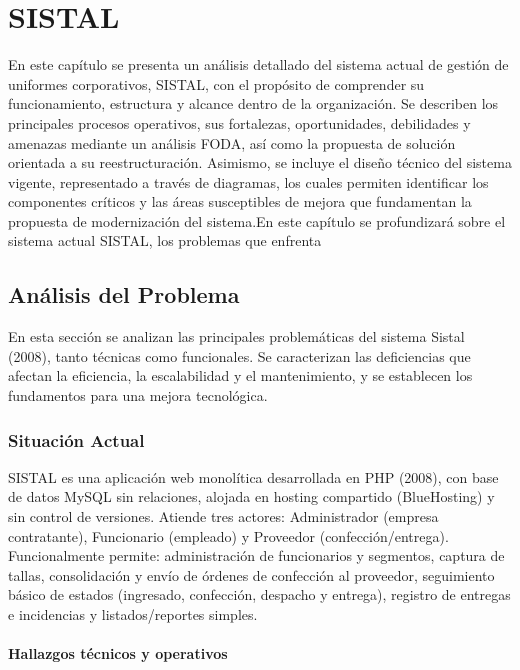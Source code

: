 \chapter{SISTAL}

En este capítulo se presenta un análisis detallado del sistema actual de gestión de uniformes corporativos, SISTAL, con el propósito de comprender su funcionamiento, estructura y alcance dentro de la organización. Se describen los principales procesos operativos, sus fortalezas, oportunidades, debilidades y amenazas mediante un análisis FODA, así como la propuesta de solución orientada a su reestructuración.
Asimismo, se incluye el diseño técnico del sistema vigente, representado a través de diagramas, los cuales permiten identificar los componentes críticos y las áreas susceptibles de mejora que fundamentan la propuesta de modernización del sistema.En este capítulo se profundizará sobre el sistema actual SISTAL, los problemas que enfrenta

\section{Análisis del Problema}

En esta sección se analizan las principales problemáticas del sistema Sistal (2008), tanto técnicas como funcionales. Se caracterizan las deficiencias que afectan la eficiencia, la escalabilidad y el mantenimiento, y se establecen los fundamentos para una mejora tecnológica.


\subsection{Situación Actual}

SISTAL es una aplicación web monolítica desarrollada en PHP (2008), con base de datos MySQL sin relaciones, alojada en hosting compartido (BlueHosting) y sin control de versiones. Atiende tres actores: Administrador (empresa contratante), Funcionario (empleado) y Proveedor (confección/entrega).
Funcionalmente permite: administración de funcionarios y segmentos, captura de tallas, consolidación y envío de órdenes de confección al proveedor, seguimiento básico de estados (ingresado, confección, despacho y entrega), registro de entregas e incidencias y listados/reportes simples.

\subsubsection{Hallazgos técnicos y operativos}


